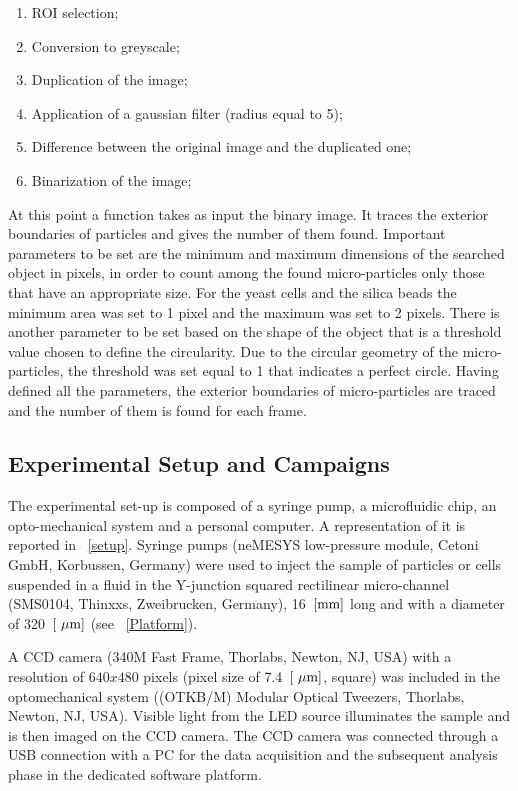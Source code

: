 \documentclass[journal]{IEEEtran}
\theoremstyle{definition}
\theoremstyle{remark}
\begin{document}
 \begin{enumerate}
 	\item ROI selection;
 	\item Conversion to greyscale;
 	\item Duplication of the image;
 	\item Application of a gaussian filter (radius equal to 5);
 	\item Difference between the original image and the duplicated one;
 	\item Binarization of the image;
 \end{enumerate}
At this point a function takes as input the binary image. It traces the exterior boundaries of particles and gives the number of them found.
Important parameters to be set are the minimum and maximum dimensions of the searched object in pixels, in order to count among the found micro-particles only those that have an appropriate size. For the yeast cells and the silica beads the minimum area was set to 1 pixel and the maximum was set to 2 pixels. There is another parameter to be set based on the shape of the object that is a threshold value chosen to define the circularity. Due to the circular geometry of the micro-particles, the threshold was set equal to 1 that indicates a perfect circle.
Having defined all the parameters, the exterior boundaries of micro-particles are traced and the number of them is found for each frame.

\subsection{Experimental Setup and Campaigns}

The experimental set-up is composed of a syringe pump, a microfluidic chip, an opto-mechanical system and a personal computer. A representation of it is reported in ~\fig\ref{setup}. Syringe pumps (neMESYS low-pressure module, Cetoni GmbH,
Korbussen, Germany) were used to inject the sample of particles or cells suspended in a fluid in the Y-junction squared rectilinear micro-channel (SMS0104, Thinxxs, Zweibrucken, Germany), 16~$[\rm mm]$ long and with a diameter of 320~$[\rm~\mu m]$ (see ~\fig\ref{Platform}).


A CCD camera (340M Fast Frame, Thorlabs, Newton, NJ, USA) with a resolution of $640x480$ pixels (pixel size of 7.4~$[\rm~\mu m]$, square) was included in the optomechanical system ((OTKB/M) Modular Optical Tweezers, Thorlabs, Newton, NJ, USA). Visible light from the LED source illuminates the sample and is then imaged
on the CCD camera.
The CCD camera was connected through a USB connection with a PC for the data acquisition and the subsequent analysis phase in the dedicated software platform.
\end{document}

